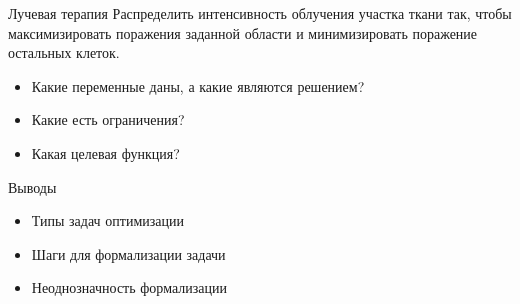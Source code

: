 \documentclass{beamer}
\begin{document}
\begin{frame}{Лучевая терапия}
Распределить интенсивность облучения участка ткани так, чтобы максимизировать поражения заданной области и минимизировать поражение остальных клеток.

\pause

\begin{itemize}[<+->]
\item Какие переменные даны, а какие являются решением?
\item Какие есть ограничения?
\item Какая целевая функция?
\end{itemize}
\end{frame}

%
%
%

\begin{frame}{Выводы}
\begin{itemize}
\item Типы задач оптимизации
\item Шаги для формализации задачи
\item Неоднозначность формализации
\end{itemize}
\end{frame}
\end{document}
